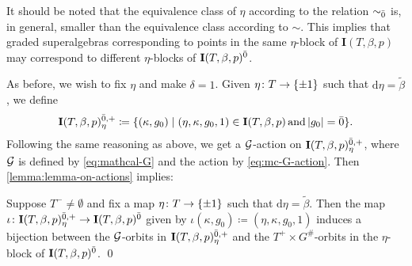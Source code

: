 \begin{remark}\label{rmk:different-eta-blocks}
    It should be noted that the equivalence class of $\eta$ according to the relation $\sim_{\bar{0}}$ is, in general, smaller than the equivalence class according to $\sim$. 
    This implies that graded superalgebras corresponding to points in the same $\eta$-block of $\mathbf{I}(T,\beta,p)$ may correspond to different $\eta$-blocks of $\mathbf{I}(T,\beta,p)^{{\bar{0}}}$.
\end{remark}

As before, we wish to fix $\eta$ and make $\delta = 1$. 
Given $\eta\colon T \to \{ \pm 1 \}$ such that $\mathrm{d}\eta = \tilde\beta$,
we define
\[
	\mathbf{I}(T, \beta, p)^{{\bar{0}}, +}_\eta \coloneqq \{ (\kappa, g_0) \mid (\eta, \kappa, g_0, 1) \in \mathbf{I}(T, \beta, p) \,\text{and}\, |g_0| = {\bar{0}} \}.
\]
Following the same reasoning as above, we get a $\mathcal G$-action on $\mathbf{I}(T, \beta, p)^{{\bar{0}}, +}_\eta$, where $\mathcal G$ is defined by \cref{eq:mathcal-G} and the action by \cref{eq:mc-G-action}. 
Then \cref{lemma:lemma-on-actions} implies:

\begin{prop}\label{prop:now-fixing-parity-of-g0}
	Suppose $T^- \neq \emptyset$ and fix a map $\eta\colon T \to \{ \pm 1 \}$ such that $\mathrm{d}\eta = \tilde\beta$.
	Then the map $\iota\colon \mathbf{I}(T,\beta,p)^{{\bar{0}}, +}_\eta \to \mathbf{I}(T,\beta,p)^{{\bar{0}}}$ given by $\iota(\kappa, g_0) \coloneqq (\eta,\kappa, g_0, 1)$ induces a bijection between the $\mathcal G$-orbits in $\mathbf{I}(T,\beta,p)^{{\bar{0}}, +}_\eta$ and the $T^+ \times G^\#$-orbits in the $\eta$-block of $\mathbf{I}(T,\beta,p)^{{\bar{0}}}$. \qed
\end{prop}